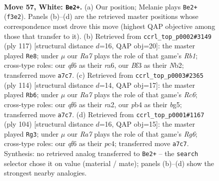 \documentclass[11pt]{article}
\begin{document}
\clearpage

\begin{figure}[p]\centering
\begin{subfigure}{0.46\textwidth}\centering
\resizebox{\linewidth}{!}{%
\newchessgame
\chessboard[
  setfen={8/R7/5q2/1k6/1p6/b4BK1/8/8 w - - 4 57},
  showmover=false,
  pgfstyle=straightmove, color=movearrow, markmove={f3-e2}
]}
\caption{}
\end{subfigure}\hfill
\begin{subfigure}{0.46\textwidth}\centering
\resizebox{\linewidth}{!}{%
\newchessgame
\chessboard[
  setfen={1r6/3k4/R7/8/1B6/2P2K2/1n6/8 b - - 2 59},
  showmover=false,
  pgfstyle=straightmove, color=movearrow, markmove={b8-e8}
]}
\caption{}
\end{subfigure}
\\[4pt]
\begin{subfigure}{0.46\textwidth}\centering
\resizebox{\linewidth}{!}{%
\newchessgame
\chessboard[
  setfen={8/6k1/2R4p/6b1/8/8/r3B3/5K2 w - - 6 58},
  showmover=false,
  pgfstyle=straightmove, color=movearrow, markmove={c6-b6}
]}
\caption{}
\end{subfigure}\hfill
\begin{subfigure}{0.46\textwidth}\centering
\resizebox{\linewidth}{!}{%
\newchessgame
\chessboard[
  setfen={8/p7/1b4R1/8/2p5/8/k3K3/8 w - - 0 53},
  showmover=false,
  pgfstyle=straightmove, color=movearrow, markmove={g6-g3}
]}
\caption{}
\end{subfigure}
\caption{\textbf{Move 57, White: \texttt{Be2+}.} (a) Our position; Melanie plays \texttt{Be2+} (\texttt{f3e2}). Panels (b)--(d) are the retrieved master positions whose correspondence most drove this move (highest QAP objective among those that transfer to it). (b) Retrieved from \texttt{ccrl\_top\_p0002\#3149} (ply 117) [structural distance $d$=16, QAP obj=20]: the master played \texttt{Re8}; under $\mu$ our \emph{Ra7} plays the role of that game's \emph{Rb1}; cross-type roles: our \emph{q}f6 as their \emph{r}a6, our \emph{B}f3 as their \emph{N}b2; transferred move \texttt{a7c7}. (c) Retrieved from \texttt{ccrl\_top\_p0003\#2365} (ply 114) [structural distance $d$=14, QAP obj=17]: the master played \texttt{Rb6}; under $\mu$ our \emph{Ra7} plays the role of that game's \emph{Rc6}; cross-type roles: our \emph{q}f6 as their \emph{r}a2, our \emph{p}b4 as their \emph{b}g5; transferred move \texttt{a7c7}. (d) Retrieved from \texttt{ccrl\_top\_p0001\#1167} (ply 104) [structural distance $d$=16, QAP obj=15]: the master played \texttt{Rg3}; under $\mu$ our \emph{Ra7} plays the role of that game's \emph{Rg6}; cross-type roles: our \emph{q}f6 as their \emph{p}c4; transferred move \texttt{a7c7}. Synthesis: no retrieved analog transferred to \texttt{Be2+} -- the \texttt{search} selector chose it on value (material / mate); panels (b)--(d) show the strongest nearby analogies.}
\label{fig:thought-m112}
\end{figure}
\end{document}
